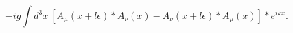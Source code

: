 \begin{equation}
  -ig \int d^3 x~
  \left[ A_\mu (x + l\epsilon) \ast A_\nu (x)
  - A_\nu (x + l \epsilon) \ast A_\mu (x) \right] \ast e^{ikx}.
\label{commutator-regularization}
\end{equation}

